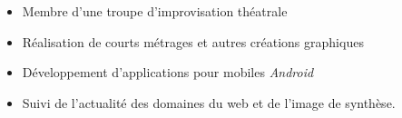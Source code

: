 \documentclass[a4paper,11pt]{article} %
\newcommand{\trad}[2]{#2}
\begin{document}

	\begin{itemize}
	\item \trad{Member of an improvisational theatre company}                   								{Membre d'une troupe d'improvisation théatrale}
	\item \trad{Direction of short films (traditional or computer generated) and other graphical creations}   	{Réalisation de courts métrages et autres créations graphiques} %
	\item \trad{Developer of mobile applications for the \textit{Android} OS}  									{Développement d'applications pour mobiles \textit{Android}}
	\item \trad{TODOweb 3d et image}  																			{Suivi de l'actualité des domaines du web et de l'image de synthèse.} 
	\end{itemize}

	

\end{document}
